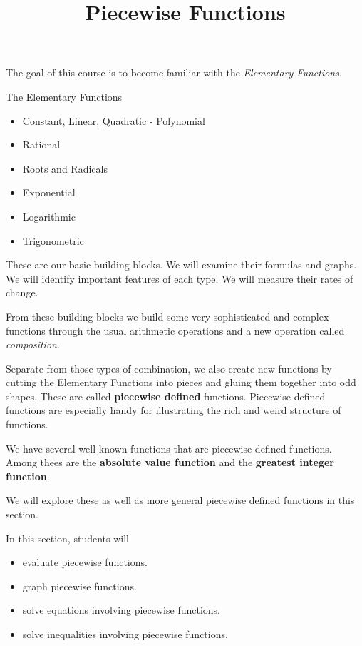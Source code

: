 \documentclass{ximera}
\title{Piecewise Functions}
\begin{document}
\begin{abstract}
\end{abstract}
\maketitle



The goal of this course is to become familiar with the \textit{Elementary Functions}. 


\begin{summary} The Elementary Functions
	\begin{itemize}
		\item Constant, Linear, Quadratic - Polynomial
		\item Rational
		\item Roots and Radicals
		\item Exponential
		\item Logarithmic
		\item Trigonometric
	\end{itemize}
\end{summary}




These are our basic building blocks.  We will examine their formulas and graphs.  We will identify important features of each type. We will measure their rates of change. 

From these building blocks we build some very sophisticated and complex functions through the usual arithmetic operations and a new operation called \textit{composition}. 

Separate from those types of combination, we also create new functions by cutting the Elementary Functions into pieces and gluing them together into odd shapes.   These are called \textbf{piecewise defined} functions.  Piecewise defined functions are especially handy for illustrating the rich and weird structure of functions.


We have several well-known functions that are piecewise defined functions. Among thees are the \textbf{absolute value function} and the \textbf{greatest integer function}.

We will explore these as well as more general piecewise defined functions in this section.










\begin{sectionOutcomes}
In this section, students will 

\begin{itemize}
\item evaluate piecewise functions.
\item graph piecewise functions.
\item solve equations involving piecewise functions.
\item solve inequalities involving piecewise functions.
\end{itemize}
\end{sectionOutcomes}
\end{document}
